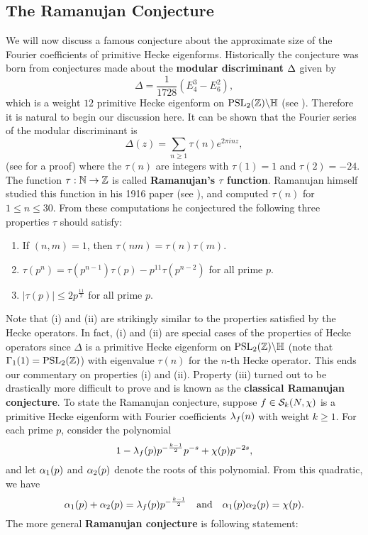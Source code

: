     \subsection*{The Ramanujan Conjecture}
      We will now discuss a famous conjecture about the approximate size of the Fourier coefficients of primitive Hecke eigenforms. Historically the conjecture was born from conjectures made about the \textbf{modular discriminant} $\Delta$ given by
      \[
        \Delta = \frac{1}{1728}(E_{4}^{3}-E_{6}^{2}),
      \]
      which is a weight $12$ primitive Hecke eigenform on $\mathrm{PSL}_{2}(\mathbb{Z})\backslash\mathbb{H}$ (see \cite{diamond2005first}). Therefore it is natural to begin our discussion here. It can be shown that the Fourier series of the modular discriminant is
      \[
        \Delta(z) = \sum_{n \ge 1}\tau(n)e^{2\pi i nz},
      \]
      (see \cite{apostol1998introduction} for a proof) where the $\tau(n)$ are integers with $\tau(1) = 1$ and $\tau(2) = -24$. The function $\tau:\mathbb{N} \to \mathbb{Z}$ is called \textbf{Ramanujan's $\tau$ function}. Ramanujan himself studied this function in his 1916 paper (see \cite{ramanujan1916certain}), and computed $\tau(n)$ for $1 \le n \le 30$. From these computations he conjectured the following three properties $\tau$ should satisfy:
      \begin{enumerate}[label=(\roman*)]
        \item If $(n,m) = 1$, then $\tau(nm) = \tau(n)\tau(m)$.
        \item $\tau(p^{n}) = \tau(p^{n-1})\tau(p)-p^{11}\tau(p^{n-2})$ for all prime $p$.
        \item $|\tau(p)| \le 2p^{\frac{11}{2}}$ for all prime $p$.
      \end{enumerate}
      Note that (i) and (ii) are strikingly similar to the properties satisfied by the Hecke operators. In fact, (i) and (ii) are special cases of the properties of Hecke operators since $\Delta$ is a primitive Hecke eigenform on $\mathrm{PSL}_{2}(\mathbb{Z})\backslash\mathbb{H}$ (note that $\Gamma_{1}(1) = \mathrm{PSL}_{2}(\mathbb{Z})$) with eigenvalue $\tau(n)$ for the $n$-th Hecke operator. This ends our commentary on properties (i) and (ii). Property (iii) turned out to be drastically more difficult to prove and is known as the \textbf{classical Ramanujan conjecture}. To state the Ramanujan conjecture, suppose $f \in \mathcal{S}_{k}(N,\chi)$ is a primitive Hecke eigenform with Fourier coefficients $\lambda_{f}(n)$ with weight $k \ge 1$. For each prime $p$, consider the polynomial
      \[
        1-\lambda_{f}(p)p^{-\frac{k-1}{2}}p^{-s}+\chi(p)p^{-2s},
      \]
      and let $\alpha_{1}(p)$ and $\alpha_{2}(p)$ denote the roots of this polynomial. From this quadratic, we have
      \[
        \alpha_{1}(p)+\alpha_{2}(p) = \lambda_{f}(p)p^{-\frac{k-1}{2}} \quad \text{and} \quad \alpha_{1}(p)\alpha_{2}(p) = \chi(p).
      \]
      The more general \textbf{Ramanujan conjecture} is following statement:

